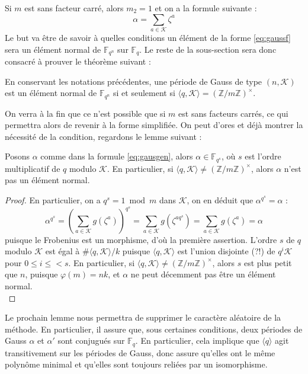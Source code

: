 \documentclass[a4paper]{article} %
\numberwithin{section}{part}
\numberwithin{equation}{section}
\newcommand\zmodninv[1]{(\mathbb{Z}/#1\mathbb{Z})^{\times}}
\newcommand\GF[1]{\mathbb{F}_{#1}}
\begin{document}
Si $m$ est sans facteur carré, alors $m_2 = 1$ et on a la formule suivante :
\begin{equation}
\label{eq:gaussf}
\alpha = \sum_{a\in\mathcal{K}}{\zeta^a}
\end{equation}
Le but va être de savoir à quelles conditions un élément de la forme
\ref{eq:gaussf} sera un élément normal de $\GF{q^n}$ sur $\GF{q}$. Le reste de
la sous-section sera donc consacré à prouver le théorème suivant :

\begin{thm}
\label{th:gaussnormal}
En conservant les notations précédentes, une période de Gauss de type
$(n,\mathcal{K})$ est un élément normal de $\GF{q^n}$ si et seulement si
$\langle q,\mathcal{K}\rangle = \zmodninv{m}$.
\end{thm}
On verra à la fin que ce n'est possible que si $m$ est sans facteurs carrés,
ce qui permettra alors de revenir à la forme simplifiée. On peut d'ores et déjà
montrer la nécessité de la condition, regardons le lemme suivant :

\begin{lem}
Posons $\alpha$ comme dans la formule \ref{eq:gausgen}, alors
$\alpha\in\GF{q^s}$, où $s$ est l'ordre multiplicatif de $q$ modulo
$\mathcal{K}$. En particulier, si $\langle
q,\mathcal{K}\rangle\neq\zmodninv{m}$, alors $\alpha$ n'est pas un élément
normal.
\end{lem}
\begin{proof}
En particulier, on a $q^s = 1 \bmod m$ dans $\mathcal{K}$, on en déduit  que 
$\alpha^{q^s} = \alpha$ :
\[\alpha^{q^s} = \left(\sum_{a\in\mathcal{K}}{g(\zeta^a)}\right)^{q^s} =
\sum_{a\in\mathcal{K}}{g(\zeta^{aq^s})} = \sum_{a\in\mathcal{K}}{g(\zeta^a)} =
\alpha\]
puisque le Frobenius est un morphisme, d'où la première assertion. L'ordre $s$ 
de $q$ modulo $\mathcal{K}$ est égal à $\#\langle q,\mathcal{K}\rangle/k$ 
puisque $\langle q,\mathcal{K}\rangle$ est l'union disjointe (?!) de 
$q^i\mathcal{K}$ pour $0\leq i\leq < s$. En particulier, si $\langle 
q,\mathcal{K}\rangle\neq\zmodninv{m}$, alors $s$ est plus petit que $n$, puisque
$\varphi(m) = nk$, et $\alpha$ ne peut décemment pas être un élément normal.\\
\end{proof}

Le prochain lemme nous permettra de supprimer le caractère aléatoire de la
méthode. En particulier, il assure que, sous certaines conditions, deux périodes
de Gauss $\alpha$ et $\alpha'$ sont conjugués sur $\GF{q}$. En particulier, cela
implique que $\langle{q}\rangle$ agit transitivement sur les périodes de Gauss,
donc assure qu'elles ont le même polynôme minimal et qu'elles sont toujours
reliées par un isomorphisme.
\end{document}
